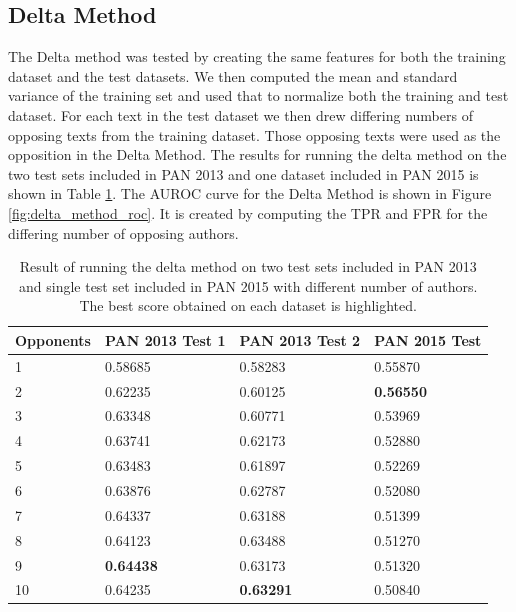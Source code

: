 \subsection{Delta Method}
The Delta method was tested by creating the same features for both the training
dataset and the test datasets. We then computed the mean and standard variance
of the training set and used that to normalize both the training and test
dataset. For each text in the test dataset we then drew differing numbers of
opposing texts from the training dataset. Those opposing texts were used as the
opposition in the Delta Method. The results for running the delta method on
the two test sets included in PAN 2013 and one dataset included in PAN 2015 is
shown in Table \ref{tab:delta_method_final_results}. The \gls{AUROC} curve for
the Delta Method is shown in Figure \ref{fig:delta_method_roc}. It is created
by computing the \gls{TPR} and \gls{FPR} for the differing number of opposing
authors.

\begin{table}
    \centering
    \begin{tabular}{l|lll}
        \textbf{Opponents} & \textbf{PAN 2013 Test 1} & \textbf{PAN 2013 Test 2}
        & \textbf{PAN 2015 Test} \\ \hline
        1  & 0.58685 & 0.58283 & 0.55870 \\
        2  & 0.62235 & 0.60125 & \textbf{0.56550} \\
        3  & 0.63348 & 0.60771 & 0.53969 \\
        4  & 0.63741 & 0.62173 & 0.52880 \\
        5  & 0.63483 & 0.61897 & 0.52269 \\
        6  & 0.63876 & 0.62787 & 0.52080 \\
        7  & 0.64337 & 0.63188 & 0.51399 \\
        8  & 0.64123 & 0.63488 & 0.51270 \\
        9  & \textbf{0.64438} & 0.63173 & 0.51320 \\
        10 & 0.64235 & \textbf{0.63291} & 0.50840
    \end{tabular}
    \caption{Result of running the delta method on two test sets included in PAN
    2013 and single test set included in PAN 2015 with different number of
    authors. The best score obtained on each dataset is highlighted.}
    \label{tab:delta_method_final_results}
\end{table}

